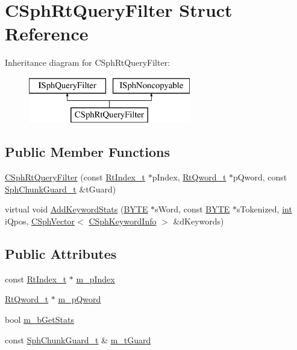 \hypertarget{structCSphRtQueryFilter}{\section{C\-Sph\-Rt\-Query\-Filter Struct Reference}
\label{structCSphRtQueryFilter}
}
Inheritance diagram for C\-Sph\-Rt\-Query\-Filter\-:\begin{figure}[H]
\begin{center}
\leavevmode
\includegraphics[height=2.000000cm]{structCSphRtQueryFilter}
\end{center}
\end{figure}
\subsection*{Public Member Functions}
\begin{DoxyCompactItemize}
\item 
\hyperlink{structCSphRtQueryFilter_a41e88559fdd948085153b4e8cf809d33}{C\-Sph\-Rt\-Query\-Filter} (const \hyperlink{structRtIndex__t}{Rt\-Index\-\_\-t} $\ast$p\-Index, \hyperlink{structRtQword__t}{Rt\-Qword\-\_\-t} $\ast$p\-Qword, const \hyperlink{structSphChunkGuard__t}{Sph\-Chunk\-Guard\-\_\-t} \&t\-Guard)
\item 
virtual void \hyperlink{structCSphRtQueryFilter_ac353700f958184ccc188402c2ecd0dd0}{Add\-Keyword\-Stats} (\hyperlink{sphinxstd_8h_a4ae1dab0fb4b072a66584546209e7d58}{B\-Y\-T\-E} $\ast$s\-Word, const \hyperlink{sphinxstd_8h_a4ae1dab0fb4b072a66584546209e7d58}{B\-Y\-T\-E} $\ast$s\-Tokenized, \hyperlink{sphinxexpr_8cpp_a4a26e8f9cb8b736e0c4cbf4d16de985e}{int} i\-Qpos, \hyperlink{classCSphVector}{C\-Sph\-Vector}$<$ \hyperlink{structCSphKeywordInfo}{C\-Sph\-Keyword\-Info} $>$ \&d\-Keywords)
\end{DoxyCompactItemize}
\subsection*{Public Attributes}
\begin{DoxyCompactItemize}
\item 
const \hyperlink{structRtIndex__t}{Rt\-Index\-\_\-t} $\ast$ \hyperlink{structCSphRtQueryFilter_a638a5f594555b01754833fde7f823f77}{m\-\_\-p\-Index}
\item 
\hyperlink{structRtQword__t}{Rt\-Qword\-\_\-t} $\ast$ \hyperlink{structCSphRtQueryFilter_a1bb30f6995b3ea86335d791c06a97323}{m\-\_\-p\-Qword}
\item 
bool \hyperlink{structCSphRtQueryFilter_a6b47b46b88ae0898296d787bc817a2b5}{m\-\_\-b\-Get\-Stats}
\item 
const \hyperlink{structSphChunkGuard__t}{Sph\-Chunk\-Guard\-\_\-t} \& \hyperlink{structCSphRtQueryFilter_a900f79e54addfd862617a060c93a342d}{m\-\_\-t\-Guard}
\end{DoxyCompactItemize}


